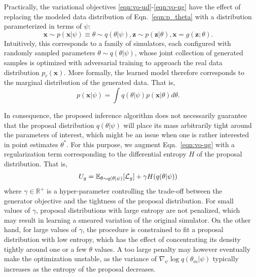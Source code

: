 \documentclass[twocolumn,superscriptaddress,aps]{revtex4-1}
\theoremstyle{plain}
\begin{document}
Practically, the variational objectives \ref{eqn:vo-ud}-\ref{eqn:vo-ug}
have the effect of replacing the modeled data distribution of Eqn.~\ref{eqn:p_theta} with
a distribution parameterized in terms of $\psi$:
\begin{equation}\label{eqn:p_psi}
    \mathbf{x} \sim p(\mathbf{x}|\psi) \equiv \theta \sim q(\theta|\psi), \mathbf{z} \sim p(\mathbf{z}|\theta), \mathbf{x} = g(\mathbf{z}; \theta).
\end{equation}
Intuitively, this corresponds to a family of simulators, each configured
with randomly sampled parameters $\theta \sim q(\theta|\psi)$, whose joint collection
of generated samples is optimized with adversarial training to approach the real data distribution $p_r(\mathbf{x})$.
More formally, the learned model  therefore corresponds to the marginal distribution
of the generated data. That is,
\begin{equation}
    p(\mathbf{x}|\psi) = \int q(\theta|\psi) p(\mathbf{x}|\theta) d\theta.
\end{equation}

In consequence, the proposed inference algorithm does not necessarily guarantee that the
proposal distribution $q(\theta|\psi)$ will place its mass arbitrarily tight
around the parameters of interest, which might be an issue when one is rather interested in point estimates $\theta^*$.
For this purpose, we augment Eqn.~\ref{eqn:vo-ug}
with a regularization term corresponding to the differential entropy $H$ of
the proposal distribution. That is,
\begin{equation}
    U_g = \mathbb{E}_{\theta \sim q(\theta|\psi)} [ {\cal L}_g ] + \gamma H(q(\theta|\psi))
\end{equation}
where $\gamma \in \mathbb{R}^+$ is a hyper-parameter controlling the trade-off
between the generator objective and the tightness of the proposal distribution.
For small values of $\gamma$,
proposal distributions with large entropy are not penalized, which may result
in learning a smeared variation of the original simulator. On the other hand,
for large values of $\gamma$, the procedure is constrained to fit a proposal
distribution with low entropy, which has the effect of concentrating its density
tightly around one or a few $\theta$ values. A too large penalty may however
eventually make the optimization unstable, as the variance of $\nabla_\psi \log q(\theta_m|\psi)$
typically increases as the entropy of the proposal decreases.



\end{document}
